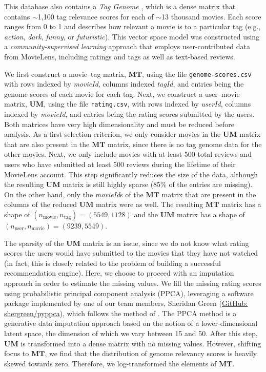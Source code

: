 \documentclass[dvipsnames]{article}
\begin{document}
This database also contains a \textit{Tag Genome} \citep{TagGenome}, which is a dense matrix that contains ${\sim}$1,100 tag relevance scores for each of ${\sim}$13 thousand movies. Each score ranges from 0 to 1 and describes how relevant a movie is to a particular tag (e.g., \textit{action}, \textit{dark}, \textit{funny}, or \textit{futuristic}). This vector space model was constructed using a \textit{community-supervised learning} approach that employs user-contributed data from MovieLens, including ratings and tags as well as text-based reviews.

We first construct a movie--tag matrix, $\mathbf{MT}$, using the file \texttt{genome-scores.csv} with rows indexed by \textit{movieId}, columns indexed \textit{tagId}, and entries being the genome scores of each movie for each tag. Next, we construct a user--movie matrix, $\mathbf{UM}$, using the file \texttt{rating.csv}, with rows indexed by \textit{userId}, columns indexed by \textit{movieId}, and entries being the rating scores submitted by the users. Both matrices have very high dimensionality and must be reduced before analysis. As a first selection criterion, we only consider movies in the $\mathbf{UM}$ matrix that are also present in the $\mathbf{MT}$ matrix, since there is no tag genome data for the other movies. Next, we only include movies with at least 500 total reviews and users who have submitted at least 500 reviews during the lifetime of their MovieLens account. This step significantly reduces the size of the data, although the resulting $\mathbf{UM}$ matrix is still highly sparse (85\% of the entries are missing). On the other hand, only the \textit{movieId}s of the $\mathbf{MT}$ matrix that are present in the columns of the reduced $\mathbf{UM}$ matrix were as well. The resulting $\mathbf{MT}$ matrix has a shape of $(n_\mathrm{movie}, n_\mathrm{tag}) = (5549, 1128)$ and the $\mathbf{UM}$ matrix has a shape of $(n_\mathrm{user}, n_\mathrm{movie}) = (9239, 5549)$.

The sparsity of the $\mathbf{UM}$ matrix is an issue, since we do not know what rating scores the users would have submitted to the movies that they have not watched (in fact, this is closely related to the problem of building a successful recommendation engine). Here, we choose to proceed with an imputation approach in order to estimate the missing values. We fill the missing rating scores using probabilistic principal component analysis (PPCA), leveraging a software package implemented by one of our team members, Sheridan Green (\href{https://github.com/shergreen/pyppca}{GitHub: shergreen/pyppca}), which follows the method of \citet{ppca}. The PPCA method is a generative data imputation approach based on the notion of a lower-dimensional latent space, the dimension of which we vary between 15 and 50. After this step, $\mathbf{UM}$ is transformed into a dense matrix with no missing values. However, shifting focus to $\mathbf{MT}$, we find that the distribution of genome relevancy scores is heavily skewed towards zero. Therefore, we log-transformed the elements of $\mathbf{MT}$.
\end{document}
